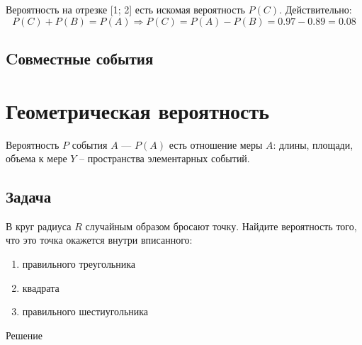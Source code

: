 \documentclass[a4paper,12pt]{article}
\begin{document}
Вероятность на отрезке [1; 2] есть искомая вероятность $P(C)$. Действительно:
$$P(C)+P(B)=P(A)\Rightarrow{}P(C)=P(A)-P(B)=0.97-0.89=0.08$$

\subsection{Cовместные события}

\section*{Геометрическая вероятность}
Вероятность $P$ события $A$ --- $P(A)$ есть отношение меры $A$: длины, площади, объема к мере $Y$ -- пространства элементарных событий.

\subsection{Задача}
В круг радиуса $R$ случайным образом бросают точку. Найдите вероятность того, что это точка окажется внутри вписанного:
\begin{enumerate}
	\item правильного треугольника
	\item квадрата
	\item правильного шестиугольника
\end{enumerate}
\begin{center}
Решение
\end{center}
\end{document}
